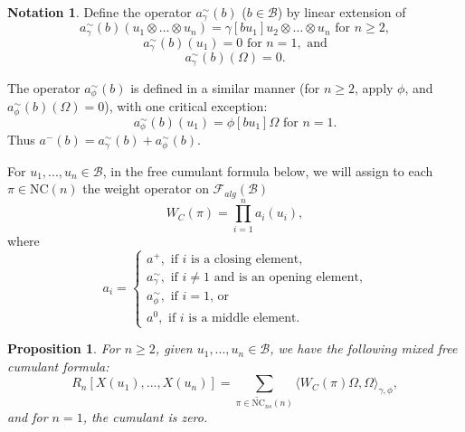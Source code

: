 \documentclass[12pt]{amsart}
\newtheorem{Prop}[Thm]{Proposition}
\theoremstyle{definition}
\newtheorem{Notation}[Thm]{Notation}
\begin{document}
\begin{Notation}
Define the operator $a_\gamma^\sim(b)$ ($b\in\mathcal{B}$) by linear extension of
	\begin{equation*}
	a_\gamma^\sim (b) (u_1 \otimes \ldots \otimes u_n) = \gamma[b u_1] u_2 \otimes \ldots \otimes u_n \text{  for }n\geq 2,
	\end{equation*}
	\begin{equation*}
	a_\gamma^\sim (b) (u_1) = 0 \text{  for }n=1,\text{ and}
	\end{equation*}
	\begin{equation*}
	a_\gamma^\sim (b) (\Omega) = 0.
	\end{equation*}
	
The operator $a_\phi^\sim (b)$ is defined in a similar manner (for $n\geq 2$, apply $\phi$, and $a_\phi^\sim (b) (\Omega) = 0$), with one critical exception:
	\begin{equation*}
	a_\phi^\sim (b) (u_1) = \phi [b u_1]\Omega \text{ for }n=1.
	\end{equation*}
Thus $a^-(b) = a_\gamma^\sim (b) + a_\phi^\sim (b)$.

For $u_1, ..., u_n \in\mathcal{B}$, in the free cumulant formula below, we will assign to each $\pi\in \mathrm{NC}(n)$ the weight operator on $\mathcal{F}_{alg}(\mathcal{B})$
	\begin{equation*}
	W_C(\pi) = \prod_{i=1}^n a_i (u_i),
	\end{equation*}
	where
	\begin{equation*}
	a_i = \begin{cases}
	a^+, \text{ if }i\text{ is a closing element,} \\
	a_\gamma^\sim, \text{ if }i\neq 1\text{ and is an opening element,} \\
	a_\phi^\sim, \text{ if }i = 1 \text{, or} \\
	a^0, \text{ if }i\text{ is a middle element.}
	\end{cases}
	\end{equation*}
\end{Notation}


\begin{Prop}\label{Prop:FreeCumulants}
	For $n\geq 2$, given $u_1, ..., u_n\in\mathcal{B}$, we have the following mixed free cumulant formula:
	\begin{equation}
	R_n[X(u_1), ..., X(u_n)] = \sum_{\pi\in\widetilde{\mathrm{NC}}_{ns}(n)} \langle W_C(\pi)\Omega, \Omega\rangle_{\gamma,\phi},
	\end{equation}
	and for $n=1$, the cumulant is zero.
\end{Prop}
\end{document}
